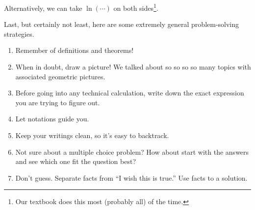 \documentclass[../main.tex]{subfiles}
\begin{document}
  Alternatively, we can take \(\ln( \cdots{} )\) on both sides\footnote{Our textbook does this most (probably all) of the time.}.

  \clearpage

  Last, but certainly not least, here are some extremely general  problem-solving strategies.

  \begin{enumerate}
    \item Remember  of definitions and theorems!
    \item When in doubt, draw a picture! We talked about so so so so many topics with associated geometric pictures.
    \item Before going into any technical calculation, write down the exact expression you are trying to figure out.
    \item Let notations guide you. 
    \item Keep your writings clean, so it's easy to backtrack.
    \item Not sure about a multiple choice problem? How about start with the answers and see which one fit the question best?
    \item Don't guess. Separate facts from ``I wish this is true.'' Use facts to  a solution.
  \end{enumerate}
\end{document}

